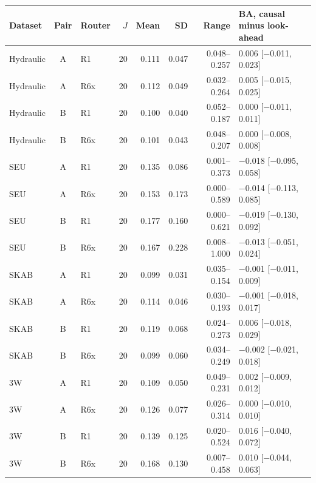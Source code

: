 \begin{tabular}{@{}l c l r r r r l@{}}
\toprule
Dataset & Pair & Router & $J$ & Mean & SD & Range & BA, causal minus look-ahead \\
\midrule
Hydraulic & A & R1 & 20 & 0.111 & 0.047 & 0.048--0.257 & 0.006 [$-$0.011, 0.023] \\
Hydraulic & A & R6x & 20 & 0.112 & 0.049 & 0.032--0.264 & 0.005 [$-$0.015, 0.025] \\
Hydraulic & B & R1 & 20 & 0.100 & 0.040 & 0.052--0.187 & 0.000 [$-$0.011, 0.011] \\
Hydraulic & B & R6x & 20 & 0.101 & 0.043 & 0.048--0.207 & 0.000 [$-$0.008, 0.008] \\
SEU & A & R1 & 20 & 0.135 & 0.086 & 0.001--0.373 & $-$0.018 [$-$0.095, 0.058] \\
SEU & A & R6x & 20 & 0.153 & 0.173 & 0.000--0.589 & $-$0.014 [$-$0.113, 0.085] \\
SEU & B & R1 & 20 & 0.177 & 0.160 & 0.000--0.621 & $-$0.019 [$-$0.130, 0.092] \\
SEU & B & R6x & 20 & 0.167 & 0.228 & 0.008--1.000 & $-$0.013 [$-$0.051, 0.024] \\
SKAB & A & R1 & 20 & 0.099 & 0.031 & 0.035--0.154 & $-$0.001 [$-$0.011, 0.009] \\
SKAB & A & R6x & 20 & 0.114 & 0.046 & 0.030--0.193 & $-$0.001 [$-$0.018, 0.017] \\
SKAB & B & R1 & 20 & 0.119 & 0.068 & 0.024--0.273 & 0.006 [$-$0.018, 0.029] \\
SKAB & B & R6x & 20 & 0.099 & 0.060 & 0.034--0.249 & $-$0.002 [$-$0.021, 0.018] \\
3W & A & R1 & 20 & 0.109 & 0.050 & 0.049--0.231 & 0.002 [$-$0.009, 0.012] \\
3W & A & R6x & 20 & 0.126 & 0.077 & 0.026--0.314 & 0.000 [$-$0.010, 0.010] \\
3W & B & R1 & 20 & 0.139 & 0.125 & 0.020--0.524 & 0.016 [$-$0.040, 0.072] \\
3W & B & R6x & 20 & 0.168 & 0.130 & 0.007--0.458 & 0.010 [$-$0.044, 0.063] \\
\bottomrule
\end{tabular}
